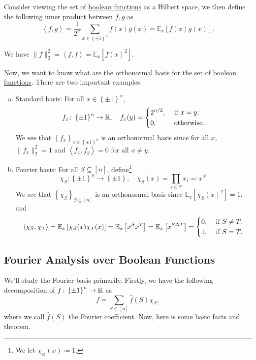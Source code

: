 Consider viewing the set of \hyperref[def:boolean-function]{boolean functions} as a Hilbert space, we then define the following inner product between \(f, g\) as
\[
	\left\langle f, g \right\rangle
	= \frac{1}{2^n} \sum_{x\in \left\{ \pm 1 \right\} ^n} f(x) g(x)
	= \mathbb{E}_{x}\left[f(x) g(x) \right] .
\]
\begin{note}
	We have \(\lVert f \rVert _2 ^2 = \left\langle f, f \right\rangle = \mathbb{E}_{x}\left[f(x)^2 \right] \).
\end{note}

Now, we want to know what are the orthonormal basis for the set of \hyperref[def:boolean-function]{boolean functions}. There are two important examples:
\begin{enumerate}[(a)]
	\item Standard basis: For all \(x\in \left\{ \pm 1\right\}^n\),
	      \[
		      f_x \colon \left\{ \pm 1 \right\} ^n \to  \mathbb{\MakeUppercase{r}} ,\quad
		      f_x (y) = \begin{dcases}
			      2^{n / 2}, & \text{ if } x=y ;   \\
			      0,         & \text{ otherwise} .
		      \end{dcases}
	      \]
	      We see that \(\left\{ f_x \right\} _{x\in \left\{ \pm 1 \right\} ^n}\) is an orthonormal basis since for all \(x\), \(\lVert f_x \rVert _2^2 = 1\) and \(\left\langle f_x, f_y \right\rangle = 0\) for all \(x \neq y\).
	\item Fourier basis: For all \(S \subseteq [n]\), define\footnote{We let \(\chi _\varnothing (x) \coloneqq 1\).}
	      \[
		      \chi _S \colon \left\{ \pm 1 \right\} ^n \to  \left\{ \pm 1 \right\} ,\quad
		      \chi _S (x) = \prod_{i\in S} x_i \eqqcolon x^S.
	      \]
	      We see that \(\left\{ \chi _S \right\}_{S \subseteq [n]} \) is an orthonormal basis since \(\mathbb{E}_{x}\left[\chi _S(x)^2 \right] = 1\), and
	      \[
		      \left\langle \chi _S, \chi _T \right\rangle
		      = \mathbb{E}_{x}\left[\chi _S(x) \chi _T(x) \right]
		      = \mathbb{E}_{x}\left[x^S x^T \right]
		      = \mathbb{E}_{x}\left[x^{S \Delta T} \right]
		      = \begin{dcases}
			      0, & \text{ if } S \neq T ; \\
			      1, & \text{ if } S = T .
		      \end{dcases}
	      \]
\end{enumerate}

\subsection{Fourier Analysis over Boolean Functions}
We'll study the Fourier basis primarily. Firstly, we have the following decomposition of \(f\colon \left\{ \pm 1 \right\} ^n \to  \mathbb{\MakeUppercase{r}} \) as
\[
	f = \sum_{S \subseteq [n]} \hat{f} (S) \chi _S,
\]
where we call \(\hat{f} (S)\) the Fourier coefficient. Now, here is some basic facts and theorem.

